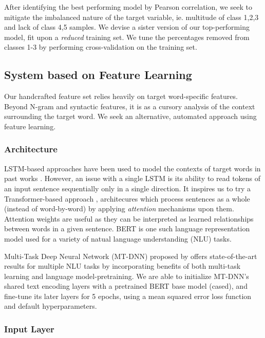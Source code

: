 \documentclass[11pt,a4paper]{article}
\begin{document}
After identifying the best performing model by Pearson correlation, we seek to mitigate the imbalanced nature of the target variable, ie. multitude of class 1,2,3 and lack of class 4,5 samples. We devise a sister version of our top-performing model, fit upon a \textit{reduced} training set. We tune the percentages removed from classes 1-3 by performing cross-validation on the training set.

\subsection{System based on Feature Learning}

Our handcrafted feature set relies heavily on target word-specific features. Beyond N-gram and syntactic features, it is as a cursory analysis of the context surrounding the target word. We seek an alternative, automated approach using feature learning.

\subsubsection{Architecture}

LSTM-based approaches have been used to model the contexts of target words in past works \citep{hartmanndossantos2018nilc, dehertogtack2018deep}. However, an issue with a single LSTM is its ability to read tokens of an input sentence sequentially only in a single direction. It inspires us to try a Transformer-based approach \citep{DBLP:journals/corr/VaswaniSPUJGKP17}, architecures which process sentences as a whole (instead of word-by-word) by applying \textit{attention} mechanisms upon them. Attention weights are useful as they can be interpreted as learned relationships between words in a given sentence. BERT \citep{DBLP:journals/corr/abs-1810-04805} is one such language representation model used for a variety of natual language understanding (NLU) tasks.

Multi-Task Deep Neural Network (MT-DNN) proposed by \citet{liuetal2019multitask} offers state-of-the-art results for multiple NLU tasks by incorporating benefits of both multi-task learning and language model-pretraining. We are able to initialize MT-DNN's shared text encoding layers with a pretrained BERT base model (cased), and fine-tune its later layers for 5 epochs, using a mean squared error loss function and default hyperparameters.

\subsubsection{Input Layer}
\end{document}
